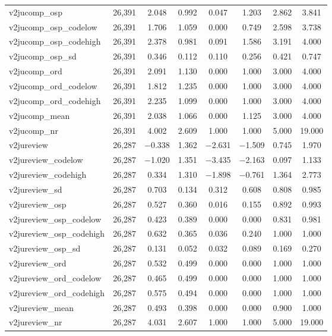 \begin{table}[!htbp]
\begin{tabular}{@{\extracolsep{5pt}}lccccccc}
v2jucomp\_osp & 26,391 & 2.048 & 0.992 & 0.047 & 1.203 & 2.862 & 3.841 \\ 
v2jucomp\_osp\_codelow & 26,391 & 1.706 & 1.059 & 0.000 & 0.749 & 2.598 & 3.738 \\ 
v2jucomp\_osp\_codehigh & 26,391 & 2.378 & 0.981 & 0.091 & 1.586 & 3.191 & 4.000 \\ 
v2jucomp\_osp\_sd & 26,391 & 0.346 & 0.112 & 0.110 & 0.256 & 0.421 & 0.747 \\ 
v2jucomp\_ord & 26,391 & 2.091 & 1.130 & 0.000 & 1.000 & 3.000 & 4.000 \\ 
v2jucomp\_ord\_codelow & 26,391 & 1.812 & 1.235 & 0.000 & 1.000 & 3.000 & 4.000 \\ 
v2jucomp\_ord\_codehigh & 26,391 & 2.235 & 1.099 & 0.000 & 1.000 & 3.000 & 4.000 \\ 
v2jucomp\_mean & 26,391 & 2.038 & 1.066 & 0.000 & 1.125 & 3.000 & 4.000 \\ 
v2jucomp\_nr & 26,391 & 4.002 & 2.609 & 1.000 & 1.000 & 5.000 & 19.000 \\ 
v2jureview & 26,287 & $-$0.338 & 1.362 & $-$2.631 & $-$1.509 & 0.745 & 1.970 \\ 
v2jureview\_codelow & 26,287 & $-$1.020 & 1.351 & $-$3.435 & $-$2.163 & 0.097 & 1.133 \\ 
v2jureview\_codehigh & 26,287 & 0.334 & 1.310 & $-$1.898 & $-$0.761 & 1.364 & 2.773 \\ 
v2jureview\_sd & 26,287 & 0.703 & 0.134 & 0.312 & 0.608 & 0.808 & 0.985 \\ 
v2jureview\_osp & 26,287 & 0.527 & 0.360 & 0.016 & 0.155 & 0.892 & 0.993 \\ 
v2jureview\_osp\_codelow & 26,287 & 0.423 & 0.389 & 0.000 & 0.000 & 0.831 & 0.981 \\ 
v2jureview\_osp\_codehigh & 26,287 & 0.632 & 0.365 & 0.036 & 0.240 & 1.000 & 1.000 \\ 
v2jureview\_osp\_sd & 26,287 & 0.131 & 0.052 & 0.032 & 0.089 & 0.169 & 0.270 \\ 
v2jureview\_ord & 26,287 & 0.532 & 0.499 & 0.000 & 0.000 & 1.000 & 1.000 \\ 
v2jureview\_ord\_codelow & 26,287 & 0.465 & 0.499 & 0.000 & 0.000 & 1.000 & 1.000 \\ 
v2jureview\_ord\_codehigh & 26,287 & 0.575 & 0.494 & 0.000 & 0.000 & 1.000 & 1.000 \\ 
v2jureview\_mean & 26,287 & 0.493 & 0.398 & 0.000 & 0.000 & 0.900 & 1.000 \\ 
v2jureview\_nr & 26,287 & 4.031 & 2.607 & 1.000 & 1.000 & 5.000 & 19.000 \\ 

\end{tabular}
\end{table}
